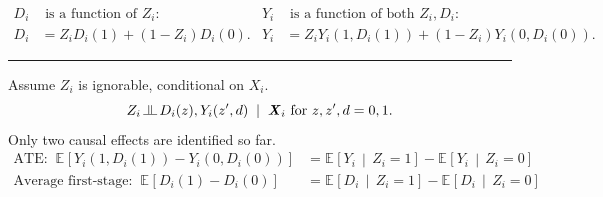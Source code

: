 \documentclass[dvipsnames,handout]{beamer} %
\renewcommand{\vec}[1]{\boldsymbol{\mathit{#1}}}                           %
\newcommand{\E}[2][]{\mathbb{E}_{#1} \left[ #2 \right]}                    %
\newcommand{\Egiven}[3][]{\mathbb{E}_{#1} \left[ #2 \, \middle\vert \, #3 \right]} %
\newcommand{\indep}{\, \raisebox{0.05em}{\rotatebox[origin=c]{90}{$\models$}} \,}%
\begin{document}
\begin{frame}
\begin{align*}
        D_i& \text{ is a function of } Z_i: &
            Y_i& \text{ is a function of both } Z_i,D_i: \\
        D_i& = Z_i D_i(1) + (1 - Z_i) D_i(0). &
            Y_i& = Z_i Y_i(1, D_i(1)) + (1 - Z_i) Y_i(0, D_i(0)).
    \end{align*}
    \par\noindent\rule{\textwidth}{0.4pt}
    \pause
    Assume $Z_i$ is ignorable, conditional on $\vec X_i$.
    \[ Z_i \indep  D_i(z), Y_i(z', d) \; \; | \;\; \vec X_i \text{ for } z, z', d = 0, 1. \]
    \pause
    Only two causal effects are identified so far.
    \begin{align*}
    \text{ATE:} \;\; \E{Y_i(1, D_i(1)) - Y_i(0, D_i(0))}
        &= \Egiven{Y_i}{Z_i = 1} - \Egiven{Y_i}{Z_i = 0} \\
    \text{Average first-stage:} \;\; \E{D_i(1) - D_i(0)}
        &=\Egiven{D_i}{Z_i = 1} - \Egiven{D_i}{Z_i = 0}
    \end{align*}
\end{frame}
\end{document}

